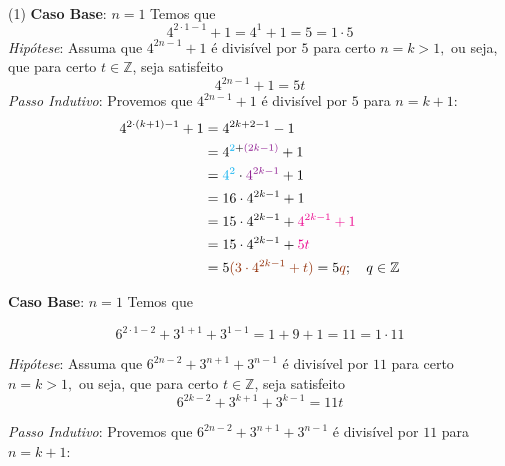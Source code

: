 \documentclass[12pt, a4paper]{article}
\newcommand{\negrito}[1]{\mbox{\boldmath{$#1$}}}
\newcommand{\Z}{\mathbb{Z}}
\newcommand{\itens}[1]{\begin{tasks}[label={(tsk[a])},label-width=3.6ex, label-format = {\bfseries}, column-sep = {0pt}](1) #1\end{tasks}}
\newcommand{\alt}[1]{\textcolor{Floresta}{$\negrito{(#1)} $}}
\begin{document}
\begin{solution}
{\begin{align*}
\end{align*}
}
\itens{
\task[\alt{d}] \textbf{Caso Base}: $n=1$
Temos que
$$4^{2\cdot1-1}+1=4^{1}+1=5=1\cdot5$$
\textit{Hipótese}: Assuma que $4^{2n-1} + 1$ é divisível por $5$ para certo $n=k>1,$ ou seja, que para certo $t \in \Z$, seja satisfeito
$$4^{2n-1} + 1=5t$$
\textit{Passo Indutivo}: Provemos que $4^{2n-1} + 1$ é divisível por $5$ para $n=k+1:$
\begin{align*}4^{2\cdot \left( k+1 \right) -1}+1&=4^{2k+2-1}-1\\&= 4^{\textcolor{Cyan}{2} + \textcolor{Plum}{(2k - 1)}} + 1\\&=\textcolor{Cyan}{4^2} \cdot \textcolor{Plum}{4^{2k-1}} + 1 \\&=16\cdot4^{2k-1}+1\\&=15 \cdot 4^{2k-1} + \textcolor{Magenta}{4^{2k-1} + 1}\\&=  15 \cdot 4^{2k-1} + \textcolor{Magenta}{5t}\\&= 5\textcolor{RawSienna}{(3 \cdot 4^{2k-1} + t)} =5\textcolor{RawSienna}{q};\quad  q \in \Z
\end{align*}

\task[\alt{e}] \textbf{Caso Base}: $n=1$
Temos que}
$$6^{2\cdot1-2}+3^{1+1}+3^{1-1}=1+9+1=11=1\cdot11$$


\textit{Hipótese}: Assuma que $6^{2n-2}+3^{n+1}+3^{n-1}$ é divisível por $11$ para certo $n=k>1,$ ou seja, que para certo $t \in \Z$, seja satisfeito
$$6^{2k-2}+3^{k+1}+3^{k-1}=11t$$

\textit{Passo Indutivo}: Provemos que $6^{2n-2}+3^{n+1}+3^{n-1}$ é divisível por $11$ para $n=k+1:$


\end{solution}
\end{document}
